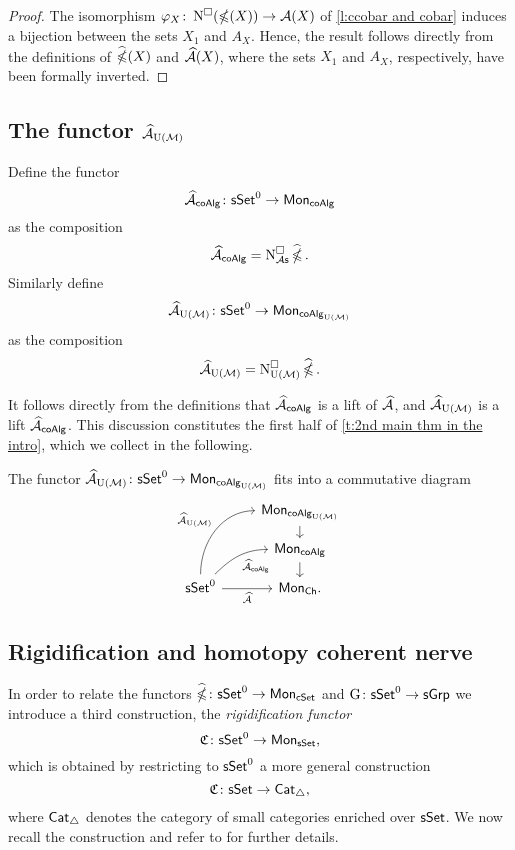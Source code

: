 \begin{proof}
	The isomorphism $\varphi_X \colon \cchains(\ccobar(X))\to \A(X)$
	of \cref{l:ccobar and cobar} induces a bijection between the sets
	$X_1$ and $A_X$.
	Hence, the result follows directly from the definitions of $\ccobarE(X)$ and $\Ahat(X)$, where the sets $X_1$ and $A_X$, respectively, have been formally inverted.
\end{proof}

\subsection{The functor $\Ahat_{\UM}$} \label{s:ahatum}

Define the functor
\[
\Ahat_{\coAlg} \colon \sSet^0 \to \Mon_{\coAlg}
\]
as the composition
\[
\Ahat_{\coAlg} = \cchainsAs \ccobarE.
\]
Similarly define
\[
\Ahat_{\UM} \colon \sSet^0 \to \Mon_{\coAlg_{\UM}}
\]
as the composition
\[
\Ahat_{\UM} = \cchainsUM \ccobarE.
\]

It follows directly from the definitions that $\Ahat_{\coAlg}$ is a lift of $\Ahat$, and $\Ahat_{\UM}$ is a lift $\Ahat_{\coAlg}$.
This discussion constitutes the first half of \cref{t:2nd main thm in the intro}, which we collect in the following.

\begin{lemma}
The functor $\Ahat_\UM \colon \sSet^0 \to \Mon_{\coAlg_\UM}$ fits into a commutative diagram
	\[
	\begin{tikzcd}[row sep=small]
	& \Mon_{\coAlg_\UM} \arrow[d] \\
	& \Mon_{\coAlg} \arrow[d] \\
	\sSet^0
	\arrow[r, "\Ahat"', ]
	\arrow[ru, "\Ahat_{\coAlg}"', out=45, in=180]
	\arrow[ruu, "\Ahat_\UM", out=90, in=180]
	& \Mon_{\Ch}.
	\end{tikzcd}
	\]
\end{lemma}

\subsection{Rigidification and homotopy coherent nerve}

In order to relate the functors $\ccobarE \colon \sSet^0 \to \Mon_{\cSet}$ and $\kan \colon \sSet^0\to \sGrp$ we introduce a third construction, the \textit{rigidification functor}
\[
\rigid \colon \sSet^0 \to \Mon_{\sSet},
\]
which is obtained by restricting to $\sSet^0$ a more general construction
\[
\rigid \colon \sSet \to \Cat_{\simplex},
\]
where $\Cat_{\simplex}$ denotes the category of small categories enriched over $\sSet$.
We now recall the construction and refer to \cite{dugger2011rigidification} for further details.

